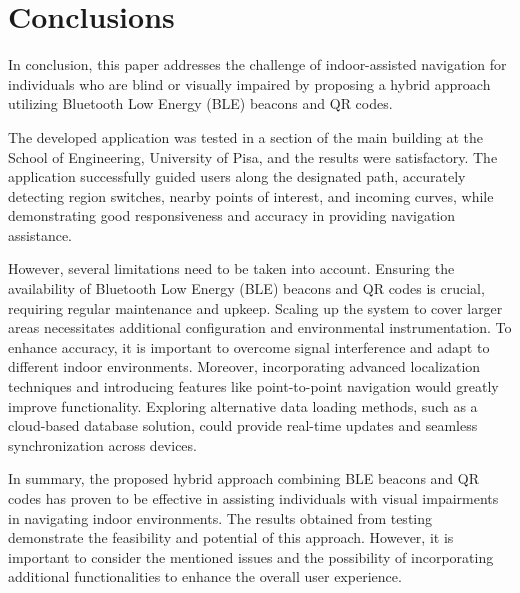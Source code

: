 \section{Conclusions}
In conclusion, this paper addresses the challenge of indoor-assisted navigation for individuals who are blind or visually impaired by proposing a hybrid approach utilizing Bluetooth Low Energy (BLE) beacons and QR codes. 

The developed application was tested in a section of the main building at the School of Engineering, University of Pisa, and the results were satisfactory. The application successfully guided users along the designated path, accurately detecting region switches, nearby points of interest, and incoming curves, while demonstrating good responsiveness and accuracy in providing navigation assistance.

However, several limitations need to be taken into account. Ensuring the availability of Bluetooth Low Energy (BLE) beacons and QR codes is crucial, requiring regular maintenance and upkeep. Scaling up the system to cover larger areas necessitates additional configuration and environmental instrumentation. To enhance accuracy, it is important to overcome signal interference and adapt to different indoor environments. Moreover, incorporating advanced localization techniques and introducing features like point-to-point navigation would greatly improve functionality. Exploring alternative data loading methods, such as a cloud-based database solution, could provide real-time updates and seamless synchronization across devices.

In summary, the proposed hybrid approach combining BLE beacons and QR codes has proven to be effective in assisting individuals with visual impairments in navigating indoor environments. The results obtained from testing demonstrate the feasibility and potential of this approach. However, it is important to consider the mentioned issues and the possibility of incorporating additional functionalities to enhance the overall user experience.
\label{sec:conclusion}
